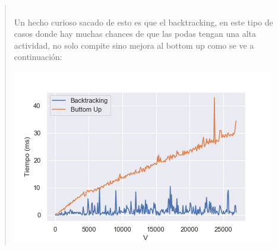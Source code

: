 \documentclass[7pt,a4paper]{article}
\begin{document}
\begin{verse}
\\
Un hecho curioso sacado de esto es que el backtracking, en este tipo de casos donde hay muchas chances de que las podas tengan una alta actividad, no solo compite sino mejora al bottom up como se ve a continuación:

\begin{center}
\includegraphics[scale=.4]{wc_bt_vs_bu_graph.png}\end{center}


\end{verse}
\end{document}
